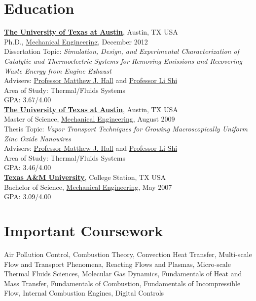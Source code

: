 \documentclass[centered]{res}
\begin{document}
\begin{resume}
\section{Education}
%
\href{http://www.utexas.edu/}{\textbf{The University of Texas at
    Austin}}, Austin, TX USA \\
Ph.D., \href{http://www.me.utexas.edu/}{Mechanical Engineering},
December 2012 \\
Dissertation Topic: \emph{Simulation, Design, and Experimental Characterization of
  Catalytic and Thermoelectric Systems for Removing Emissions and
  Recovering Waste Energy from Engine Exhaust} \\
Advisers:
\href{http://www.me.utexas.edu/directory/faculty/hall/matthew/33/}{Professor
  Matthew J. Hall} and \href{http://www.me.utexas.edu/~lishi/}{Professor Li Shi}\\
Area of Study: Thermal/Fluids Systems \\
GPA: 3.67/4.00 \\
%
\href{http://www.utexas.edu/}{\textbf{The University of Texas at
    Austin}}, Austin, TX USA \\
Master of Science, \href{http://www.me.utexas.edu/}{Mechanical
  Engineering}, August 2009 \\
Thesis Topic: \emph{Vapor Transport Techniques for Growing
  Macroscopically Uniform Zinc Oxide Nanowires} \\
Advisers:
\href{http://www.me.utexas.edu/directory/faculty/hall/matthew/33/}{Professor
  Matthew J. Hall} and \href{http://www.me.utexas.edu/~lishi/}{Professor Li Shi}\\
Area of Study: Thermal/Fluids Systems \\
GPA: 3.46/4.00\\
%
\href{http://www.tamu.edu/}{\textbf{Texas A\&M University}}, College
Station, TX USA \\
Bachelor of Science, \href{http://www.mengr.tamu.edu/}{Mechanical
  Engineering}, May
2007  \\
GPA: 3.09/4.00

\section{Important Coursework}
Air Pollution Control, Combustion Theory, Convection Heat Transfer,
Multi-scale Flow and Transport Phenomena, Reacting Flows and Plasmas,
Micro-scale Thermal Fluids Sciences, Molecular Gas Dynamics,
Fundamentals of Heat and Mass Transfer, Fundamentals of Combustion,
Fundamentals of Incompressible Flow, Internal Combustion Engines,
Digital Controls
 

\end{resume}
\end{document}
